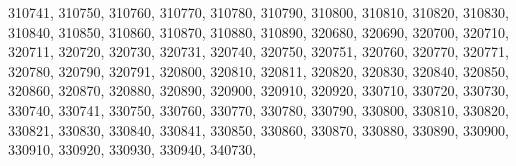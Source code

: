 \textquotesingle{}310741\textquotesingle{}, \textquotesingle{}310750\textquotesingle{}, \textquotesingle{}310760\textquotesingle{}, \textquotesingle{}310770\textquotesingle{}, \textquotesingle{}310780\textquotesingle{}, \textquotesingle{}310790\textquotesingle{}, \textquotesingle{}310800\textquotesingle{}, \textquotesingle{}310810\textquotesingle{}, \textquotesingle{}310820\textquotesingle{}, \textquotesingle{}310830\textquotesingle{}, \textquotesingle{}310840\textquotesingle{}, \textquotesingle{}310850\textquotesingle{}, \textquotesingle{}310860\textquotesingle{}, \textquotesingle{}310870\textquotesingle{}, \textquotesingle{}310880\textquotesingle{}, \textquotesingle{}310890\textquotesingle{}, \textquotesingle{}320680\textquotesingle{}, \textquotesingle{}320690\textquotesingle{}, \textquotesingle{}320700\textquotesingle{}, \textquotesingle{}320710\textquotesingle{}, \textquotesingle{}320711\textquotesingle{}, \textquotesingle{}320720\textquotesingle{}, \textquotesingle{}320730\textquotesingle{}, \textquotesingle{}320731\textquotesingle{}, \textquotesingle{}320740\textquotesingle{}, \textquotesingle{}320750\textquotesingle{}, \textquotesingle{}320751\textquotesingle{}, \textquotesingle{}320760\textquotesingle{}, \textquotesingle{}320770\textquotesingle{}, \textquotesingle{}320771\textquotesingle{}, \textquotesingle{}320780\textquotesingle{}, \textquotesingle{}320790\textquotesingle{}, \textquotesingle{}320791\textquotesingle{}, \textquotesingle{}320800\textquotesingle{}, \textquotesingle{}320810\textquotesingle{}, \textquotesingle{}320811\textquotesingle{}, \textquotesingle{}320820\textquotesingle{}, \textquotesingle{}320830\textquotesingle{}, \textquotesingle{}320840\textquotesingle{}, \textquotesingle{}320850\textquotesingle{}, \textquotesingle{}320860\textquotesingle{}, \textquotesingle{}320870\textquotesingle{}, \textquotesingle{}320880\textquotesingle{}, \textquotesingle{}320890\textquotesingle{}, \textquotesingle{}320900\textquotesingle{}, \textquotesingle{}320910\textquotesingle{}, \textquotesingle{}320920\textquotesingle{}, \textquotesingle{}330710\textquotesingle{}, \textquotesingle{}330720\textquotesingle{}, \textquotesingle{}330730\textquotesingle{}, \textquotesingle{}330740\textquotesingle{}, \textquotesingle{}330741\textquotesingle{}, \textquotesingle{}330750\textquotesingle{}, \textquotesingle{}330760\textquotesingle{}, \textquotesingle{}330770\textquotesingle{}, \textquotesingle{}330780\textquotesingle{}, \textquotesingle{}330790\textquotesingle{}, \textquotesingle{}330800\textquotesingle{}, \textquotesingle{}330810\textquotesingle{}, \textquotesingle{}330820\textquotesingle{}, \textquotesingle{}330821\textquotesingle{}, \textquotesingle{}330830\textquotesingle{}, \textquotesingle{}330840\textquotesingle{}, \textquotesingle{}330841\textquotesingle{}, \textquotesingle{}330850\textquotesingle{}, \textquotesingle{}330860\textquotesingle{}, \textquotesingle{}330870\textquotesingle{}, \textquotesingle{}330880\textquotesingle{}, \textquotesingle{}330890\textquotesingle{}, \textquotesingle{}330900\textquotesingle{}, \textquotesingle{}330910\textquotesingle{}, \textquotesingle{}330920\textquotesingle{}, \textquotesingle{}330930\textquotesingle{}, \textquotesingle{}330940\textquotesingle{}, \textquotesingle{}340730\textquotesingle{}, 